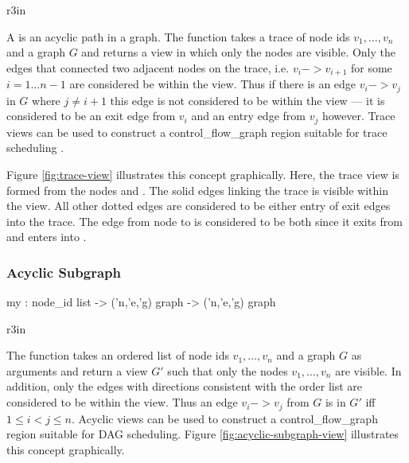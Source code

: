 \begin{wrapfigure}{r}{3in}
  \begin{Boxit}
  \end{Boxit}
  \label{fig:trace-view}
  \caption{A trace view}
\end{wrapfigure}
A  is an acyclic path in a graph.
The function  takes a trace of node ids
$v_1,\ldots,v_n$ and a graph $G$ and 
returns a view in which only the nodes are visible.
Only the edges that connected two adjacent nodes on the trace, i.e. 
$v_i -> v_{i+1}$ for some $i = 1 \ldots n-1$ are considered be within
the view.  Thus if there is an edge $v_i -> v_j$ in $G$ where
$j \ne i+1$ this edge is not considered to be within the view --- it
is considered to be an exit edge from $v_i$ and an entry edge
from $v_j$ however.  Trace views can be used to construct a control_flow_graph region
suitable for trace scheduling \cite{trace-scheduling,bulldog}.   

Figure \ref{fig:trace-view} illustrates this concept graphically.
Here, the trace view is formed from the
nodes  and .  The
solid edges linking the trace is visible within the view.  All other
dotted edges are considered to be either entry of exit edges into
the trace.  The edge from node  to  is considered to
be both since it exits from  and enters into .

\subsubsection{Acyclic Subgraph}
\begin{SML}
   my  : 
     node_id list -> 
     ('n,'e,'g) graph -> ('n,'e,'g) graph
\end{SML}
\begin{wrapfigure}{r}{3in}
  \begin{Boxit}
  \end{Boxit}
  \label{fig:acyclic-subgraph-view}
  \caption{An acyclic subgraph}
\end{wrapfigure}
The function  takes an ordered
list of node ids $v_1,\ldots,v_n$ and a graph $G$ as arguments
and return a view $G'$ such that only the nodes $v_1,\ldots,v_n$
are visible.  In addition, only the edges with directions consistent
with the order list are considered to be within the view.
Thus an edge $v_i -> v_j$ from $G$ is in $G'$ iff $1 \le i < j \le n$.
Acyclic views can be used to construct a control_flow_graph region suitable
for DAG scheduling.
Figure \ref{fig:acyclic-subgraph-view} illustrates this concept graphically.

